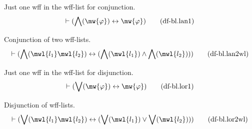 \begin{metadefinition} Just one wff in the wff-list for
conjunction.
\begin{align}
\vdash ( \bigwedge( \mw{\varphi} ) \leftrightarrow \mw{\varphi}
    )\label{eq:df-bl.lan1}\tag{df-bl.lan1}
\end{align}
\end{metadefinition}


\begin{metadefinition} Conjunction of two wff-lists.
\begin{align}
\vdash ( \bigwedge( \mwl{l_1} \mwl{l_2} ) \leftrightarrow ( \bigwedge(
    \mwl{l_1} ) \wedge \bigwedge( \mwl{l_2} ) )
    )\label{eq:df-bl.lan2wl}\tag{df-bl.lan2wl}
\end{align}
\end{metadefinition}


\begin{metadefinition} Just one wff in the wff-list for
disjunction.
\begin{align}
\vdash ( \bigvee( \mw{\varphi} ) \leftrightarrow \mw{\varphi}
    )\label{eq:df-bl.lor1}\tag{df-bl.lor1}
\end{align}
\end{metadefinition}


\begin{metadefinition} Disjunction of wff-lists.
\begin{align}
\vdash ( \bigvee( \mwl{l_1} \mwl{l_2} ) \leftrightarrow ( \bigvee( \mwl{l_1} )
    \vee \bigvee( \mwl{l_2} ) ) )\label{eq:df-bl.lor2wl}\tag{df-bl.lor2wl}
\end{align}
\end{metadefinition}


